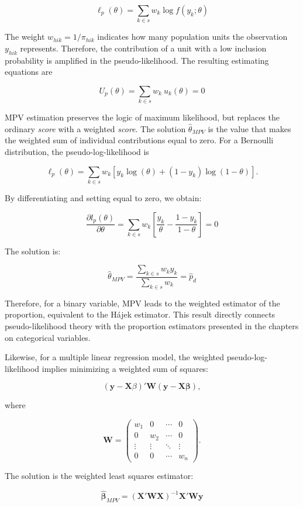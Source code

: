 \documentclass[
  english,
  12pt,
]{book}
\begin{document}
\[
\ell_p(\theta)
= \sum_{k \in s} w_k \log f(y_k;\theta)
\]

The weight \(w_{hik}=1/\pi_{hik}\) indicates how many population units the observation \(y_{hik}\) represents. Therefore, the contribution of a unit with a low inclusion probability is amplified in the pseudo-likelihood. The resulting estimating equations are

\[
U_p(\theta)
= \sum_{k \in s} w_k \ u_k(\theta)
= 0
\]

MPV estimation preserves the logic of maximum likelihood, but replaces the ordinary \emph{score} with a weighted \emph{score}. The solution \(\hat{\theta}_{MPV}\) is the value that makes the weighted sum of individual contributions equal to zero. For a Bernoulli distribution, the pseudo-log-likelihood is

\[
\ell_p(\theta)
= \sum_{k \in s} w_k
\left[
y_k\log(\theta)
+(1-y_k)\log(1-\theta)
\right].
\]

By differentiating and setting equal to zero, we obtain:

\[
\frac{\partial l_p(\theta)}{\partial \theta}
=
\sum_{k \in s} w_k
\left[
\frac{y_k}{\theta}
-\frac{1-y_k}{1-\theta}
\right]
=0
\]

The solution is:

\[
\hat{\theta}_{MPV}
=
\frac{\sum_{k \in s}w_k y_k}
     {\sum_{k \in s}w_k}
= \hat{p}_d
\]

Therefore, for a binary variable, MPV leads to the weighted estimator of the proportion, equivalent to the Hájek estimator. This result directly connects pseudo-likelihood theory with the proportion estimators presented in the chapters on categorical variables.

Likewise, for a multiple linear regression model, the weighted pseudo-log-likelihood implies minimizing a weighted sum of squares:

\[
(\mathbf{y}-\mathbf{X}\beta)'\mathbf{W}(\mathbf{y}-\mathbf{X}\boldsymbol{\beta}),
\]

where

\[
\mathbf{W}=
\begin{pmatrix}
w_1 & 0 & \cdots & 0\\
0 & w_2 & \cdots & 0\\
\vdots & \vdots & \ddots & \vdots\\
0 & 0 & \cdots & w_n
\end{pmatrix}.
\]

The solution is the weighted least squares estimator:

\[
\hat{\boldsymbol{\beta}}_{MPV}
= (\mathbf{X}'\mathbf{W}\mathbf{X})^{-1}\mathbf{X}'\mathbf{W}\mathbf{y}
\]
\end{document}
